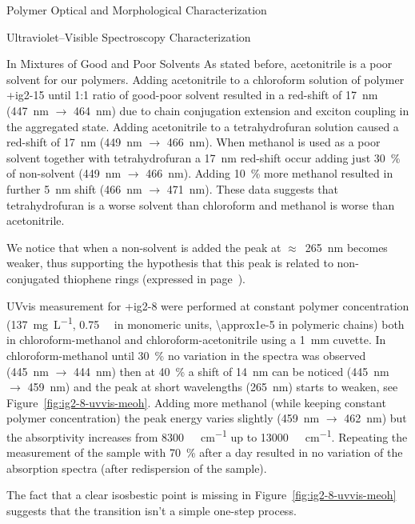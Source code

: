 \begin{section}{Polymer Optical and Morphological Characterization}
\begin{subsection}{Ultraviolet--Visible Spectroscopy Characterization}
\begin{subsubsection}{In Mixtures of Good and Poor Solvents}
As stated before, acetonitrile is a poor solvent for our polymers. Adding acetonitrile to a chloroform solution of polymer \cmpd+{ig2-15} until 1:1 ratio of good-poor solvent resulted in a red-shift of \SI{17}{\nm} (\SI{447}{\nm} $\rightarrow$ \SI{464}{\nm}) due to chain conjugation extension and exciton coupling in the aggregated state. 
Adding acetonitrile to a tetrahydrofuran solution caused a red-shift of \SI{17}{\nm} (\SI{449}{\nm} $\rightarrow$ \SI{466}{\nm}).
When methanol is used as a poor solvent together with tetrahydrofuran a \SI{17}{\nm} red-shift occur adding just 30~\% of non-solvent (\SI{449}{\nm} $\rightarrow$ \SI{466}{\nm}). 
Adding 10~\% more methanol resulted in further \SI{5}{\nm} shift (\SI{466}{\nm} $\rightarrow$ \SI{471}{\nm}). These data suggests that tetrahydrofuran is a worse solvent than chloroform and methanol is worse than acetonitrile.

We notice that when a non-solvent is added the peak at $\approx$~\SI{265}{\nm} becomes weaker, thus supporting the hypothesis that this peak is related to non-conjugated thio\-phene rings (expressed in page~\pageref{peak-265}).

\Gls{UVvis} measurement for \cmpd+{ig2-8} were performed at constant polymer concentration (\SI{137}{\mg\per\liter}, \SI{0.75}{\milli\Molar} in monomeric units, \SI{\approx1e-5}{\Molar} in polymeric chains) both in chloro\-form-methanol and chloro\-form-aceto\-nitrile using a \SI{1}{\mm} cuvette. 
In chloro\-form-methanol until 30~\%  no variation in the spectra was observed (\SI{445}{\nm} $\rightarrow$ \SI{444}{\nm}) then at 40~\%  a shift of \SI{14}{\nm} can be noticed (\SI{445}{\nm} $\rightarrow$ \SI{459}{\nm}) and the peak at short wavelengths (\SI{265}{\nm}) starts to weaken, see Figure~\ref{fig:ig2-8-uvvis-meoh}. 
Adding more methanol (while keeping constant polymer concentration) the peak energy varies slightly (\SI{459}{\nm} $\rightarrow$ \SI{462}{\nm}) but the absorptivity increases from \SI{8300}{\per\Molar\per\cm} up to \SI{13000}{\per\Molar\per\cm}. Repeating the measurement of the sample with 70~\%  after a day resulted in no variation of the absorption spectra (after re\-dispersion of the sample).

The fact that a clear iso\-sbestic point is missing in Figure~\ref{fig:ig2-8-uvvis-meoh} suggests that the transition isn't a simple one-step process. 


\end{subsubsection}
\end{subsection}
\end{section}
